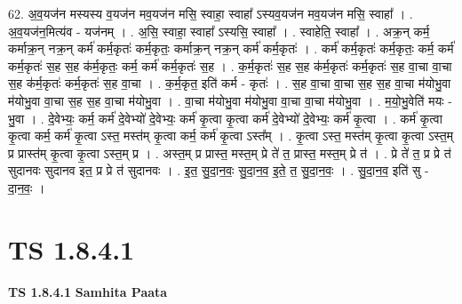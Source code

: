 \documentclass[17pt]{extarticle}
\begin{document}
62. अ॒व॒यज॑न मस्यस्य व॒यज॑न मव॒यज॑न मसि॒ स्वाहा॒ स्वाहा᳚ ऽस्यव॒यज॑न मव॒यज॑न मसि॒ स्वाहा᳚ । . अ॒व॒यज॑न॒मित्य॑व - यज॑नम् । . अ॒सि॒ स्वाहा॒ स्वाहा᳚ ऽस्यसि॒ स्वाहा᳚ । . स्वाहेति॒ स्वाहा᳚ । . अक्र॒न् कर्म॒ कर्माक्र॒न् नक्र॒न् कर्म॑ कर्म॒कृतः॑ कर्म॒कृतः॒ कर्माक्र॒न् नक्र॒न् कर्म॑ कर्म॒कृतः॑ । . कर्म॑ कर्म॒कृतः॑ कर्म॒कृतः॒ कर्म॒ कर्म॑ कर्म॒कृतः॑ स॒ह स॒ह क॑र्म॒कृतः॒ कर्म॒ कर्म॑ कर्म॒कृतः॑ स॒ह । . क॒र्म॒कृतः॑ स॒ह स॒ह क॑र्म॒कृतः॑ कर्म॒कृतः॑ स॒ह वा॒चा वा॒चा स॒ह क॑र्म॒कृतः॑ कर्म॒कृतः॑ स॒ह वा॒चा । . क॒र्म॒कृत॒ इति॑ कर्म - कृतः॑ । . स॒ह वा॒चा वा॒चा स॒ह स॒ह वा॒चा म॑योभु॒वा म॑योभु॒वा वा॒चा स॒ह स॒ह वा॒चा म॑योभु॒वा । . वा॒चा म॑योभु॒वा म॑योभु॒वा वा॒चा वा॒चा म॑योभु॒वा । . म॒यो॒भु॒वेति॑ मयः - भु॒वा । . दे॒वेभ्यः॒ कर्म॒ कर्म॑ दे॒वेभ्यो॑ दे॒वेभ्यः॒ कर्म॑ कृ॒त्वा कृ॒त्वा कर्म॑ दे॒वेभ्यो॑ दे॒वेभ्यः॒ कर्म॑ कृ॒त्वा । . कर्म॑ कृ॒त्वा कृ॒त्वा कर्म॒ कर्म॑ कृ॒त्वा ऽस्त॒ मस्त॑म् कृ॒त्वा कर्म॒ कर्म॑ कृ॒त्वा ऽस्त᳚म् । . कृ॒त्वा ऽस्त॒ मस्त॑म् कृ॒त्वा कृ॒त्वा ऽस्त॒म् प्र प्रास्त॑म् कृ॒त्वा कृ॒त्वा ऽस्त॒म् प्र । . अस्त॒म् प्र प्रास्त॒ मस्त॒म् प्रे ते॑ त॒ प्रास्त॒ मस्त॒म् प्रे त॑ । . प्रे ते॑ त॒ प्र प्रे त॑ सुदानवः सुदानव इत॒ प्र प्रे त॑ सुदानवः । . इ॒त॒ सु॒दा॒न॒वः॒ सु॒दा॒न॒व॒ इ॒ते॒ त॒ सु॒दा॒न॒वः॒ । . सु॒दा॒न॒व॒ इति॑ सु - दा॒न॒वः॒ । \newline
\pagebreak
{}
\section*{ TS 1.8.4.1 }

\textbf{TS 1.8.4.1 } \newline
\textbf{Samhita Paata} \newline
\end{document}
